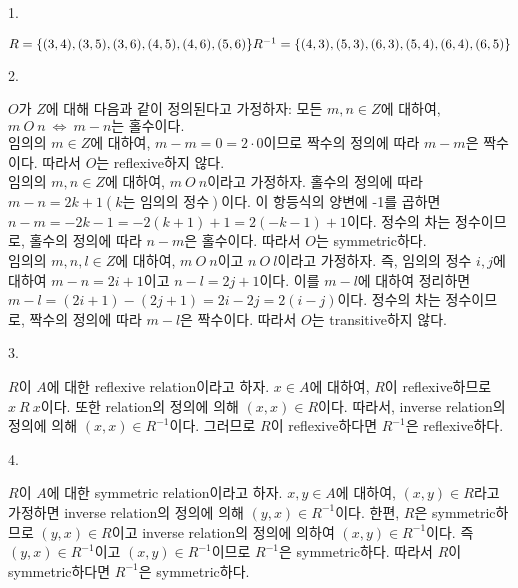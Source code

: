 \documentclass{article}
\begin{document}
\newline

1.
\begin{addmargin}[1em]{2em}
$R=\{(3,4), (3,5), (3,6), (4, 5), (4,6),(5,6)\}\\
R^{-1}=\{(4,3), (5,3),(6,3),(5,4),(6,4),(6,5)\}$
\end{addmargin}
\bigskip

2.
\begin{addmargin}[1em]{2em}
$O$가 $Z$에 대해 다음과 같이 정의된다고 가정하자: 모든 $m,n \in Z$에 대하여, $m\ O\ n\ \Leftrightarrow\ m-n\mbox{는 홀수이다.}$ \\
임의의 $m\in Z$에 대하여, $m-m=0=2\cdot 0$이므로 짝수의 정의에 따라 $m-m$은 짝수이다. 따라서 $O$는 reflexive하지 않다. \\
임의의 $m,n\in Z$에 대하여, $m\ O\ n$이라고 가정하자. 홀수의 정의에 따라 $m-n=2k+1(k\mbox{는 임의의 정수})$이다. 이 항등식의 양변에 -1를 곱하면 $n-m=-2k-1=-2(k+1)+1=2(-k-1)+1$이다. 정수의 차는 정수이므로, 홀수의 정의에 따라 $n-m$은 홀수이다. 따라서 $O$는 symmetric하다. \\
임의의 $m,n,l\in Z$에 대하여, $m\ O\ n$이고 $n\ O\ l$이라고 가정하자. 즉, 임의의 정수 $i,j$에 대하여 $m-n=2i+1$이고 $n-l=2j+1$이다. 이를 $m-l$에 대하여 정리하면 $m-l=(2i+1)-(2j+1)=2i-2j=2(i-j)$이다. 정수의 차는 정수이므로, 짝수의 정의에 따라 $m-l$은 짝수이다. 따라서 $O$는 transitive하지 않다.
\end{addmargin}
\bigskip

3.
\begin{addmargin}[1em]{2em}
$R$이 $A$에 대한 reflexive relation이라고 하자. $x\in A$에 대하여, $R$이 reflexive하므로 $x\ R\ x$이다. 또한 relation의 정의에 의해 $(x, x)\in R$이다. 따라서, inverse relation의 정의에 의해 $(x, x)\in R^{-1}$이다. 그러므로 $R$이 reflexive하다면 $R^{-1}$은 reflexive하다.
\end{addmargin}
\bigskip

4.
\begin{addmargin}[1em]{2em}
$R$이 $A$에 대한 symmetric relation이라고 하자. $x, y \in A$에 대하여, $(x,y)\in R$라고 가정하면 inverse relation의 정의에 의해 $(y, x)\in R^{-1}$이다. 한편, $R$은 symmetric하므로 $(y, x)\in R$이고 inverse relation의 정의에 의하여 $(x, y)\in R^{-1}$이다. 즉 $(y, x)\in R^{-1}$이고 $(x, y)\in R^{-1}$이므로 $R^{-1}$은 symmetric하다.
따라서 $R$이 symmetric하다면 $R^{-1}$은 symmetric하다. 
\end{addmargin} 
\bigskip
\end{document}
